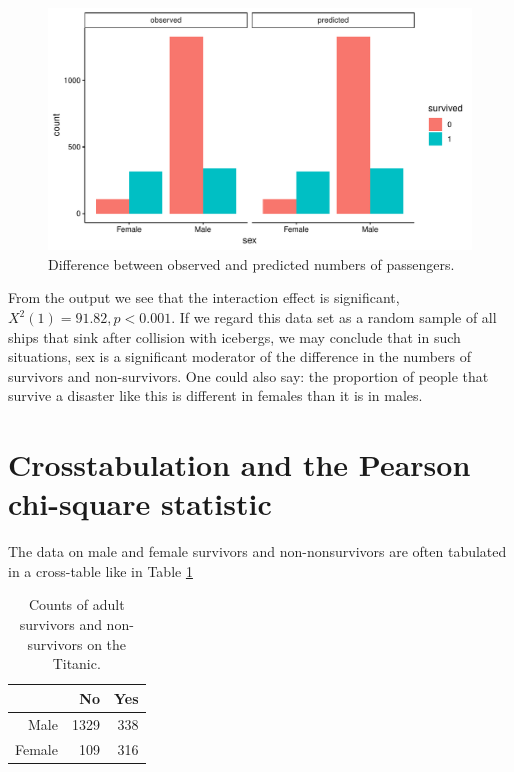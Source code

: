 \documentclass[]{book}\usepackage[]{graphicx}\usepackage[]{color}
\makeatletter
\def\maxwidth{ %
  \ifdim\Gin@nat@width>\linewidth
    \linewidth
  \else
    \Gin@nat@width
  \fi
}
\makeatother
\begin{document}
\begin{figure}

{\centering \includegraphics[width=\maxwidth]{figure/gen_23-1} 

}

\caption[Difference between observed and predicted numbers of passengers]{Difference between observed and predicted numbers of passengers.}\label{fig:gen_23}
\end{figure}



From the output we see that the interaction effect is significant, $X^2(1)=91.82, p<0.001$. If we regard this data set as a random sample of all ships that sink after collision with icebergs, we may conclude that in such situations, sex is a significant moderator of the difference in the numbers of survivors and non-survivors. One could also say: the proportion of people that survive a disaster like this is different in females than it is in males. 


\section{Crosstabulation and the Pearson chi-square statistic}

The data on male and female survivors and non-nonsurvivors are often tabulated in a cross-table like in Table \ref{tab:gen_24}


\begin{table}[ht]
\centering
\caption{Counts of adult survivors and non-survivors on the Titanic.} 
\label{tab:gen_24}
\begin{tabular}{rrr}
  \hline
 & No & Yes \\ 
  \hline
Male & 1329 & 338 \\ 
  Female & 109 & 316 \\ 
   \hline
\end{tabular}
\end{table}
\end{document}
